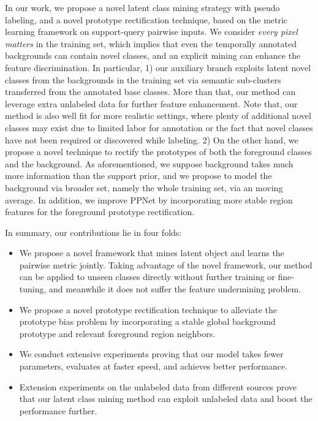 \documentclass[10pt,twocolumn,letterpaper]{article}
\begin{document}
In our work, we propose a novel latent class mining strategy with pseudo labeling, and a novel prototype rectification technique, based on the metric learning framework on support-query pairwise inputs. We consider \textit{every pixel matters} in the training set, which implies that even the temporally annotated backgrounds can contain novel classes, and an explicit mining can enhance the feature discrimination. In particular, 1) our auxiliary branch exploits latent novel classes from the backgrounds in the training set via semantic sub-clusters transferred from the annotated base classes. More than that, our method can leverage extra unlabeled data for further feature enhancement. Note that, our method is also well fit for more realistic settings, where plenty of additional novel classes may exist due to limited labor for annotation or the fact that novel classes have not been required or discovered while labeling. 2) On the other hand, we propose a novel technique to rectify the prototypes of both the foreground classes and the background. As aforementioned, we suppose background takes much more information than the support prior, and we propose to model the background via broader set, namely the whole training set, via an moving average. In addition, we improve PPNet \cite{liu2020part} by incorporating more stable region features for the foreground prototype rectification. 

In summary, our contributions lie in four folds:
\begin{itemize}
\setlength{\itemsep}{0pt}
\setlength{\parsep}{0pt}
\setlength{\parskip}{0pt}
\item We propose a novel framework that mines latent object and learns the pairwise metric jointly. Taking advantage of the novel framework, our method can be applied to unseen classes directly without further training or fine-tuning, and meanwhile it does not suffer the feature undermining problem. 

\item We propose a novel prototype rectification technique to alleviate the prototype bias problem by incorporating a stable global background prototype and relevant foreground region neighbors. 

\item We conduct extensive experiments proving that our model takes fewer parameters, evaluates at faster speed, and achieves better performance. 

\item Extension experiments on the unlabeled data from different sources prove that our latent class mining method can exploit unlabeled data and boost the performance further.

\end{itemize}
\end{document}
